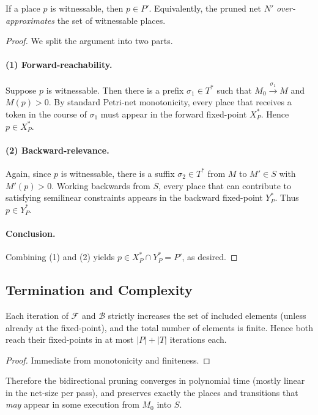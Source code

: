 \begin{theorem}
	\label{thm:invariant}
	If a place $p$ is witnessable, then $p\in P'$.  Equivalently, the
	pruned net $N'$ \emph{over-approximates} the set of witnessable places.
\end{theorem}

\begin{proof}
	We split the argument into two parts.
	
	\paragraph{(1) Forward-reachability.}
	Suppose $p$ is witnessable.  Then there is a prefix
	$\sigma_1\in T^*$ such that $M_0\xrightarrow{\sigma_1}M$ and
	$M(p)>0$.  By standard Petri-net monotonicity, every place that
	receives a token in the course of $\sigma_1$ must appear in the
	forward fixed-point $X^*_P$.  Hence $p\in X^*_P$.
	
	\paragraph{(2) Backward-relevance.}
	Again, since $p$ is witnessable, there is a suffix
	$\sigma_2\in T^*$ from $M$ to $M'\in S$ with $M'(p)>0$.  Working
	backwards from $S$, every place that can contribute to satisfying
	semilinear constraints appears in the backward fixed-point $Y^*_P$.
	Thus $p\in Y^*_P$.
	
	\paragraph{Conclusion.}
	Combining (1) and (2) yields $p\in X^*_P\cap Y^*_P = P'$, as desired.
\end{proof}

\subsection{Termination and Complexity}

\begin{lemma}
	Each iteration of $\mathcal{F}$ and $\mathcal{B}$ strictly increases
	the set of included elements (unless already at the fixed-point), and
	the total number of elements is finite.  Hence both reach their
	fixed-points in at most $|P|+|T|$ iterations each.
\end{lemma}

\begin{proof}
	Immediate from monotonicity and finiteness.
\end{proof}

\noindent
Therefore the bidirectional pruning converges in polynomial time
(mostly linear in the net-size per pass), and preserves exactly the
places and transitions that \emph{may} appear in some execution from
$M_0$ into $S$.
